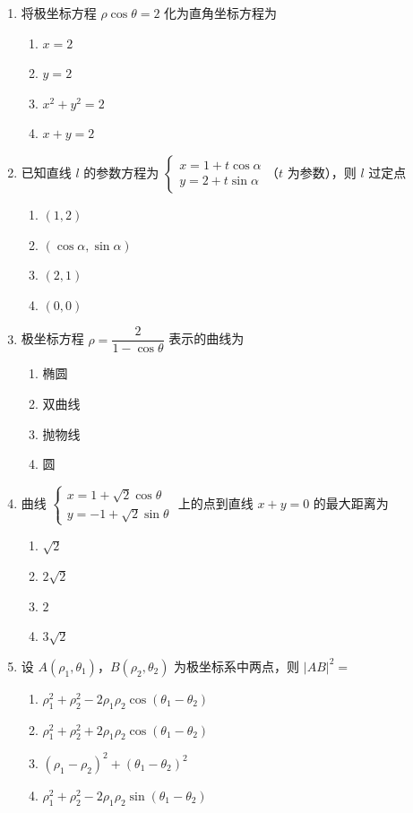 \documentclass[12pt, a4paper]{ctexart}
\newcommand{\score}[1]{\hfill\makebox[2cm][l]{(#1分)}}
\begin{document}
\begin{enumerate}
\item 将极坐标方程 $\rho\cos\theta = 2$ 化为直角坐标方程为\score{5}
\begin{enumerate}[label=\Alph*.]
\item $x = 2$
\item $y = 2$
\item $x^2 + y^2 = 2$
\item $x + y = 2$
\end{enumerate}

\item 已知直线 $l$ 的参数方程为 $\begin{cases} x = 1 + t\cos\alpha \\ y = 2 + t\sin\alpha \end{cases}$（$t$ 为参数），则 $l$ 过定点\score{5}
\begin{enumerate}[label=\Alph*.]
\item $(1, 2)$
\item $(\cos\alpha, \sin\alpha)$
\item $(2, 1)$
\item $(0, 0)$
\end{enumerate}

\item 极坐标方程 $\rho = \dfrac{2}{1 - \cos\theta}$ 表示的曲线为\score{5}
\begin{enumerate}[label=\Alph*.]
\item 椭圆
\item 双曲线
\item 抛物线
\item 圆
\end{enumerate}

\item 曲线 $\begin{cases} x = 1 + \sqrt{2}\cos\theta \\ y = -1 + \sqrt{2}\sin\theta \end{cases}$ 上的点到直线 $x + y = 0$ 的最大距离为\score{5}
\begin{enumerate}[label=\Alph*.]
\item $\sqrt{2}$
\item $2\sqrt{2}$
\item $2$
\item $3\sqrt{2}$
\end{enumerate}

\item 设 $A(\rho_1, \theta_1)$，$B(\rho_2, \theta_2)$ 为极坐标系中两点，则 $|AB|^2 = $\score{5}
\begin{enumerate}[label=\Alph*.]
\item $\rho_1^2 + \rho_2^2 - 2\rho_1\rho_2\cos(\theta_1 - \theta_2)$
\item $\rho_1^2 + \rho_2^2 + 2\rho_1\rho_2\cos(\theta_1 - \theta_2)$
\item $(\rho_1 - \rho_2)^2 + (\theta_1 - \theta_2)^2$
\item $\rho_1^2 + \rho_2^2 - 2\rho_1\rho_2\sin(\theta_1 - \theta_2)$
\end{enumerate}

\end{enumerate}
\end{document}

